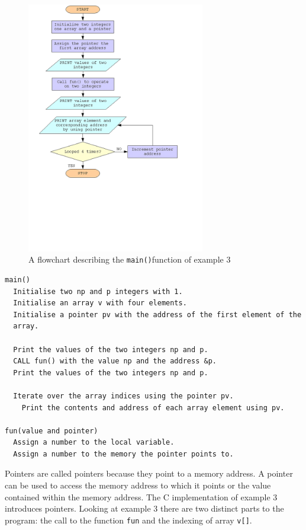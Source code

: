 \documentclass[11pt]{scrartcl}
\def\main{\texttt{main()}}
\begin{document}
\begin{figure}[h]
\begin{center}
\includegraphics[height=11cm]{figures/ex3}
\caption{A flowchart describing the \main function of example 3
\label{figure:flowchart_ex3}}
\end{center}
\end{figure}

\begin{pseudocode}[h]
\begin{verbatim}
main()
  Initialise two np and p integers with 1.
  Initialise an array v with four elements.
  Initialise a pointer pv with the address of the first element of the
  array. 

  Print the values of the two integers np and p.
  CALL fun() with the value np and the address &p.
  Print the values of the two integers np and p.

  Iterate over the array indices using the pointer pv.
    Print the contents and address of each array element using pv.

fun(value and pointer)
  Assign a number to the local variable.
  Assign a number to the memory the pointer points to.
\end{verbatim}
\caption{Example 3 in pseudocode \label{pseudo:ex3}}
\end{pseudocode}

Pointers are called pointers because they point to a memory address.
A pointer can be used to access the memory address to which it points
or the value contained within the memory address.  The C
implementation of example 3 introduces pointers.  Looking at example 3
there are two distinct parts to the program: the call to the function
\texttt{fun} and the indexing of array \texttt{v[]}.
\end{document}

